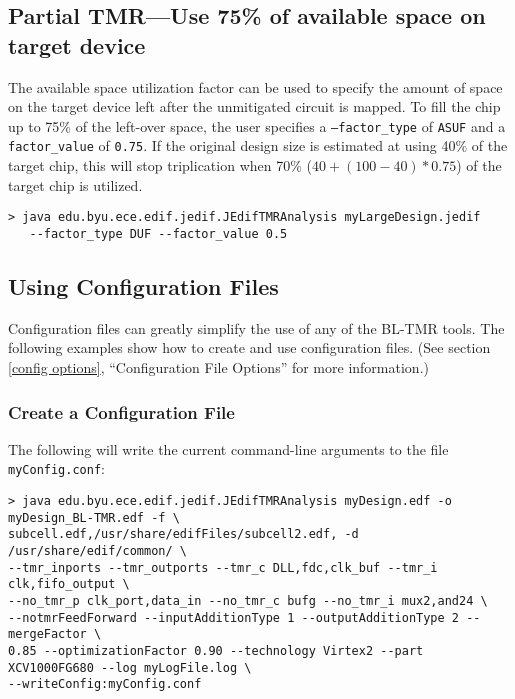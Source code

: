 \subsection{Partial TMR---Use 75\% of available space on target device}
The available space utilization factor can be used to specify the amount of
space on the target device left after the unmitigated circuit is mapped. To
fill the chip up to 75\% of the left-over space, the user specifies a 
\texttt{--factor\_type} of \texttt{ASUF} and a \texttt{factor\_value} of 
\texttt{0.75}. If the original design size is estimated at using 40\% of the
target chip, this will stop triplication when 70\% ($40 + (100-40)*0.75$) of
the target chip is utilized.

\begin{verbatim}
> java edu.byu.ece.edif.jedif.JEdifTMRAnalysis myLargeDesign.jedif 
   --factor_type DUF --factor_value 0.5
\end{verbatim}


\subsection{Using Configuration Files}
\label{using config}
Configuration files can greatly simplify the use of any of the
 BL-TMR tools.  The following examples show how to create and use
 configuration files. (See section \ref{config options},
 ``Configuration File Options'' for more information.)

\subsubsection{Create a Configuration File}
The following will write the current command-line arguments to the file
\texttt{myConfig.conf}:

\begin{verbatim}
> java edu.byu.ece.edif.jedif.JEdifTMRAnalysis myDesign.edf -o myDesign_BL-TMR.edf -f \ 
subcell.edf,/usr/share/edifFiles/subcell2.edf, -d /usr/share/edif/common/ \ 
--tmr_inports --tmr_outports --tmr_c DLL,fdc,clk_buf --tmr_i clk,fifo_output \ 
--no_tmr_p clk_port,data_in --no_tmr_c bufg --no_tmr_i mux2,and24 \ 
--notmrFeedForward --inputAdditionType 1 --outputAdditionType 2 --mergeFactor \ 
0.85 --optimizationFactor 0.90 --technology Virtex2 --part XCV1000FG680 --log myLogFile.log \
--writeConfig:myConfig.conf
\end{verbatim}

